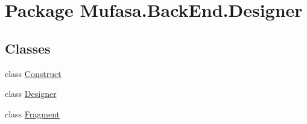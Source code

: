 \hypertarget{namespace_mufasa_1_1_back_end_1_1_designer}{\section{Package Mufasa.\+Back\+End.\+Designer}
\label{namespace_mufasa_1_1_back_end_1_1_designer}
}
\subsection*{Classes}
\begin{DoxyCompactItemize}
\item 
class \hyperlink{class_mufasa_1_1_back_end_1_1_designer_1_1_construct}{Construct}
\item 
class \hyperlink{class_mufasa_1_1_back_end_1_1_designer_1_1_designer}{Designer}
\item 
class \hyperlink{class_mufasa_1_1_back_end_1_1_designer_1_1_fragment}{Fragment}
\end{DoxyCompactItemize}

